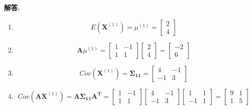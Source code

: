 \documentclass[12pt, a4paper, oneside]{ctexart}
\newenvironment{solution}{\par\noindent\textbf{解答. }}{\par}
\begin{document}
\begin{solution}
    \begin{enumerate}[label=(\alph*)]
        \item 
        \[
            E(\mathbf{X}^{(1)})=\mu^{(1)}
            =\begin{bmatrix}
                2\\
                4
            \end{bmatrix}
        \]
        \item 
        \[
            \mathbf{A}\mu^{(1)}=
            \begin{bmatrix}
                1 & -1\\
                1 & 1
            \end{bmatrix}
            \begin{bmatrix}
                2\\
                4
            \end{bmatrix}=
            \begin{bmatrix}
                -2\\
                6
            \end{bmatrix}
        \]
        \item
        \[
            Cov(\mathbf{X}^{(1)})=\bm{\Sigma_{11}}=
            \begin{bmatrix}
                4 & -1 \\
                -1 & 3
            \end{bmatrix}
        \] 
        \item 
        \[
            Cov(\mathbf{A}\mathbf{X}^{(1)})=\mathbf{A}\bm{\Sigma_{11}}\mathbf{A^T}=
            \begin{bmatrix}
                1 & -1\\
                1 & 1
            \end{bmatrix}
            \begin{bmatrix}
                4 & -1 \\
                -1 & 3
            \end{bmatrix}
            \begin{bmatrix}
                1 & 1\\
                -1 & 1
            \end{bmatrix}
            =\begin{bmatrix}
                9 & 1 \\
                1 & 5
            \end{bmatrix}
\]
\end{enumerate}
\end{solution}
\end{document}
